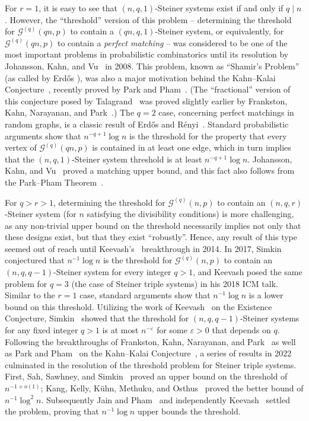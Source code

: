 \documentclass[twoside,leqno]{article}
\begin{document}
For $r = 1$, it is easy to see that $(n,q,1)$-Steiner systems exist if and only if $q \mid n$.  However, the ``threshold'' version of this problem -- determining the threshold for $\mathcal{G}^{(q)}(qn,p)$ to contain a $(qn,q,1)$-Steiner system, or equivalently, for $\mathcal{G}^{(q)}(qn,p)$ to contain a \textit{perfect matching} -- was considered to be one of the most important problems in probabilistic combinatorics until its resolution by Johansson, Kahn, and Vu~\cite{JKV08} in 2008. This problem, known as ``Shamir's Problem'' (as called by Erd\H{o}s \cite{E81b}), was also a major motivation behind the Kahn--Kalai Conjecture~\cite{KK07}, recently proved by Park and Pham~\cite{PP23}.  (The ``fractional'' version of this conjecture posed by Talagrand~\cite{Ta10} was proved slightly earlier by Frankston, Kahn, Narayanan, and Park~\cite{FKNP21}.)  The $q = 2$ case, concerning perfect matchings in random graphs, is a classic result of Erd\H{o}s and R\'enyi~\cite{ER66}.  Standard probabilistic arguments show that $n^{-q+1}\log n$ is the threshold for the property that every vertex of $\mathcal{G}^{(q)}(qn,p)$ is contained in at least one edge, which in turn implies that the $(n,q,1)$-Steiner system threshold is at least $n^{-q + 1}\log n$.  Johansson, Kahn, and Vu~\cite{JKV08} proved a matching upper bound, and this fact also follows from the Park--Pham Theorem~\cite{PP23}. 

For $q > r > 1$, determining the threshold for $\mathcal{G}^{(q)}(n, p)$ to contain an $(n,q,r)$-Steiner system (for $n$ satisfying the divisibility conditions) is more challenging, as any non-trivial upper bound on the threshold necessarily implies not only that these designs exist, but that they exist ``robustly''. Hence, any result of this type seemed out of reach until Keevash's~\cite{K14} breakthrough in 2014. In 2017, Simkin~\cite{S17} conjectured that $n^{-1}\log n$ is the threshold for $\mathcal{G}^{(q)}(n,p)$ to contain an $(n,q,q-1)$-Steiner system for every integer $q > 1$, and Keevash posed the same problem for $q = 3$ (the case of Steiner triple systems) in his 2018 ICM talk. 
Similar to the $r = 1$ case, standard arguments show that $n^{-1}\log n$ is a lower bound on this threshold.
Utilizing the work of Keevash~\cite{K14} on the Existence Conjecture, Simkin~\cite{S17} showed that the threshold for $(n,q,q-1)$-Steiner systems for any fixed integer $q > 1$ is at most $n^{-\varepsilon}$ for some $\varepsilon > 0$ that depends on $q$.
Following the breakthroughs of Frankston, Kahn, Narayanan, and Park~\cite{FKNP21} as well as Park and Pham~\cite{PP23} on the Kahn--Kalai Conjecture~\cite{KK07}, a series of results in 2022 culminated in the resolution of the threshold problem for Steiner triple systems.
First, Sah, Sawhney, and Simkin~\cite{SSS23} proved an upper bound on the threshold of $n^{-1+o(1)}$; Kang, Kelly, K\"uhn, Methuku, and Osthus~\cite{KKKMO22} proved the better bound of $n^{-1}\log^2 n$. Subsequently Jain and Pham~\cite{JP22} and independently Keevash~\cite{K22} settled the problem, proving that $n^{-1}\log n$ upper bounds the threshold.
\end{document}
